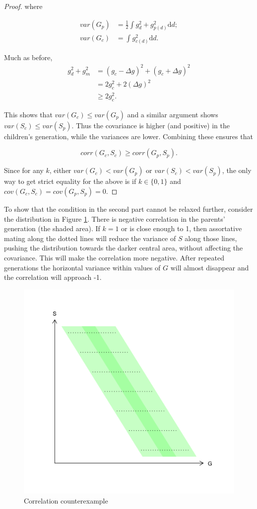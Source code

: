 \documentclass[
]{article}
\begin{document}
\begin{proof}
where 

\begin{align*}
var(G_{p}) & =\frac{1}{2}\int g_{d}^{2}+g_{p(d)}^{2}\textrm{d}d;\\
var(G_{c}) & =\int g_{c(d)}^{2}\textrm{d}d.
\end{align*}

Much as before,
\begin{align*}
g_{d}^{2}+g_{m}^{2} & =(g_{c}-\Delta g)^{2}+(g_{c}+\Delta g)^{2}\\
 & =2g_{c}^{2}+2(\Delta g)^{2}\\
 & \ge2g_{c}^{2}.
\end{align*}

This shows that $var(G_{c})\le var(G_{p})$ and a similar argument
shows $var(S_{c})\le var(S_{p})$. Thus the covariance is higher (and
positive) in the children's generation, while the variances are lower.
Combining these ensures that 

\[
corr(G_{c},S_{c}) \ge corr(G_{p},S_{p}).
\]

Since for any $k$, either $var(G_{c}) < var(G_{p})$ or $var(S_{c}) < var(S_{p})$,
the only way to get strict equality for the above is if $k \in \{0,1\}$
and $cov(G_{c}, S_{c}) = cov(G_{p},S_{p}) = 0$.

\end{proof}

To show that the condition in the second part cannot be relaxed further,
consider the distribution in Figure
\ref{fig:Correlation-counterexample}. There is negative correlation in
the parents' generation (the shaded area). If \(k = 1\) or is close enough
to 1, then assortative mating along the dotted lines will reduce the
variance of \(S\) along those lines, pushing the distribution towards the
darker central area, without affecting the covariance. This will make
the correlation more negative. After repeated generations the horizontal
variance within values of \(G\) will almost disappear and the correlation
will approach -1.

\begin{figure}
\begin{centering}
\includegraphics[width=0.5\columnwidth]{correlation-counterexample}
\par\end{centering}
\caption{Correlation counterexample\label{fig:Correlation-counterexample}}

\end{figure}
\end{document}
